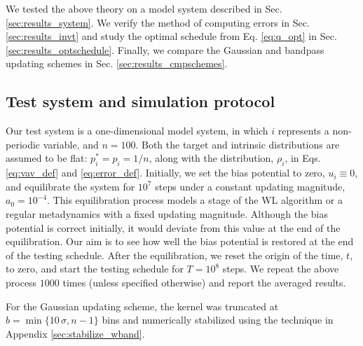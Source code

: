 \documentclass[preprint, floatfix]{revtex4-1}
\begin{document}
We tested the above theory on a model system
described in Sec. \ref{sec:results_system}.
%
We verify the method of computing errors
in Sec. \ref{sec:results_invt}
%
and study the optimal schedule from
Eq. \eqref{eq:q_opt}
in Sec. \ref{sec:results_optschedule}.
%
Finally, we compare the Gaussian and
bandpass updating schemes %
in Sec. \ref{sec:results_cmpschemes}.



\subsection{\label{sec:results_system}
Test system and simulation protocol}



Our test system is a one-dimensional model system, in which
$i$ represents a non-periodic variable,
and $n = 100$.
%
Both the target and intrinsic distributions
are assumed to be flat:
$p^*_i = p_i = 1/n$,
along with the distribution, $\rho_i$, in Eqs.
\eqref{eq:vav_def} and \eqref{eq:error_def}.
%
%
Initially,
we set the bias potential to zero,
$u_i \equiv 0$,
and equilibrate the system for $10^7$ steps
under a constant updating magnitude,
$a_0 = 10^{-4}$.
%
This equilibration process models
a stage of the WL algorithm or
a regular metadynamics
with a fixed updating magnitude.
%
Although the bias potential is correct initially,
it would deviate from this value
at the end of the equilibration.
%
Our aim is to see how well
the bias potential is restored
at the end of the testing schedule.
%
After the equilibration,
we reset the origin of the time, $t$, to zero,
and start the testing schedule
for $T = 10^8$ steps.
%
We repeat the above process $1000$ times (unless specified otherwise)
and report the averaged results.



For the Gaussian updating scheme,
the kernel was truncated at
$b = \min\{10 \, \sigma, n - 1\}$ bins
and numerically stabilized
using the technique
in Appendix \ref{sec:stabilize_wband}.
\end{document}
